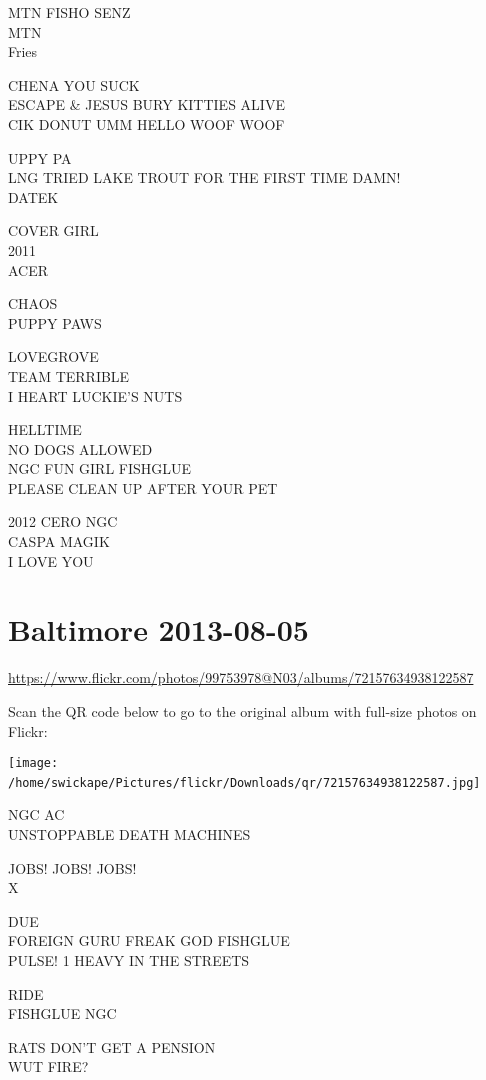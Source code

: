 \documentclass[10pt,letterpaper]{article}
\begin{document}
MTN FISHO SENZ\\
MTN\\
Fries

CHENA YOU SUCK\\
ESCAPE \& JESUS BURY KITTIES ALIVE\\
CIK DONUT UMM HELLO WOOF WOOF

UPPY PA\\
LNG TRIED LAKE TROUT FOR THE FIRST TIME DAMN!\\
DATEK

COVER GIRL\\
2011\\
ACER

CHAOS\\
PUPPY PAWS

LOVEGROVE\\
TEAM TERRIBLE\\
I HEART LUCKIE'S NUTS

HELLTIME\\
NO DOGS ALLOWED\\
NGC FUN GIRL FISHGLUE\\
PLEASE CLEAN UP AFTER YOUR PET

2012 CERO NGC\\
CASPA MAGIK\\
I LOVE YOU
\

\section*{Baltimore 2013-08-05}

\url{https://www.flickr.com/photos/99753978@N03/albums/72157634938122587}

Scan the QR code below to go to the original album with full-size photos on Flickr:

\texttt{[image: /home/swickape/Pictures/flickr/Downloads/qr/72157634938122587.jpg]}
\

NGC AC\\
UNSTOPPABLE DEATH MACHINES

JOBS! JOBS! JOBS!\\
X

DUE\\
FOREIGN GURU FREAK GOD FISHGLUE\\
PULSE! 1 HEAVY IN THE STREETS

RIDE\\
FISHGLUE NGC

RATS DON'T GET A PENSION\\
WUT FIRE?
\end{document}
